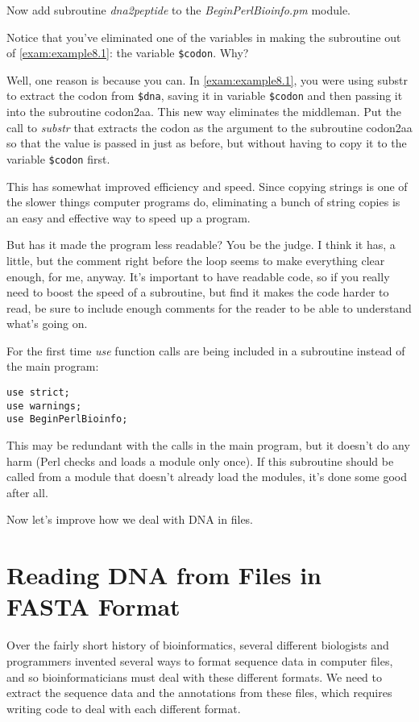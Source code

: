 Now add subroutine \textit{dna2peptide} to the \textit{BeginPerlBioinfo.pm} module.

Notice that you've eliminated one of the variables in making the subroutine out of \autoref{exam:example8.1}: the variable \verb|$codon|. Why?

Well, one reason is because you can. In \autoref{exam:example8.1}, you were using substr to extract the codon from \verb|$dna|, saving it in variable \verb|$codon| and then passing it into the subroutine codon2aa. This new way eliminates the middleman. Put the call to \textit{substr} that extracts the codon as the argument to the subroutine codon2aa so that the value is passed in just as before, but without having to copy it to the variable \verb|$codon| first. 

This has somewhat improved efficiency and speed. Since copying strings is one of the slower things computer programs do, eliminating a bunch of string copies is an easy and effective way to speed up a program.

But has it made the program less readable? You be the judge. I think it has, a little, but the comment right before the loop seems to make everything clear enough, for me, anyway. It's important to have readable code, so if you really need to boost the speed of a subroutine, but find it makes the code harder to read, be sure to include enough comments for the reader to be able to understand what's going on.

For the first time \textit{use} function calls are being included in a subroutine instead of the main program:

\begin{lstlisting}
use strict;
use warnings;
use BeginPerlBioinfo;
\end{lstlisting}

This may be redundant with the calls in the main program, but it doesn't do any harm (Perl checks and loads a module only once). If this subroutine should be called from a module that doesn't already load the modules, it's done some good after all.

Now let's improve how we deal with DNA in files. 

\section{Reading DNA from Files in FASTA Format}
Over the fairly short history of bioinformatics, several different biologists and programmers invented several ways to format sequence data in computer files, and so bioinformaticians must deal with these different formats. We need to extract the sequence data and the annotations from these files, which requires writing code to deal with each different format.

